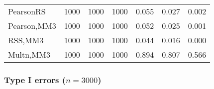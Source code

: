 \documentclass[
]{article}
\begin{document}
\begin{table}[H]
{\begin{tabular}[t]{lrrrrrr}
\hspace{1em}PearsonRS & 1000 & 1000 & 1000 & 0.055 & 0.027 & 0.002\\
\hspace{1em}Pearson,MM3 & 1000 & 1000 & 1000 & 0.052 & 0.025 & 0.001\\
\hspace{1em}RSS,MM3 & 1000 & 1000 & 1000 & 0.044 & 0.016 & 0.000\\
\hspace{1em}Multn,MM3 & 1000 & 1000 & 1000 & 0.894 & 0.807 & 0.566\\
\bottomrule
\end{tabular}}
\end{table}

\hypertarget{type-i-errors-n3000-2}{%
\subsubsection{\texorpdfstring{Type I errors
(\(n=3000\))}{Type I errors (n=3000)}}\label{type-i-errors-n3000-2}}
\end{document}
